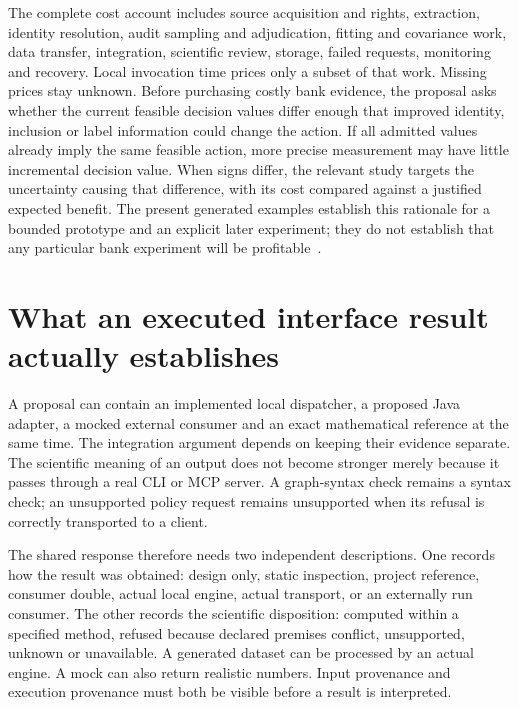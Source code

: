 The complete cost account includes source acquisition and rights, extraction,
identity resolution, audit sampling and adjudication, fitting and covariance
work, data transfer, integration, scientific review, storage, failed requests,
monitoring and recovery. Local invocation time prices only a subset of that
work. Missing prices stay unknown. Before purchasing costly bank evidence,
the proposal asks whether the current feasible decision values differ enough
that improved identity, inclusion or label information could change the action.
If all admitted values already imply the same feasible action, more precise
measurement may have little incremental decision value. When signs differ,
the relevant study targets the uncertainty causing that difference, with
its cost compared against a justified expected benefit. The present generated
examples establish this rationale for a bounded prototype and an explicit
later experiment; they do not establish that any particular bank experiment
will be profitable~\citep{exec13_observation_design,exec13_observation_exact}.
\label{exec13:observation-journey-end}


\section{What an executed interface result actually establishes}
\label{exec14:execution-meaning}

A proposal can contain an implemented local dispatcher, a proposed Java adapter,
a mocked external consumer and an exact mathematical reference at the same time.
The integration argument depends on keeping their evidence separate. The
scientific meaning of an output does not become stronger merely because it
passes through a real CLI or MCP server. A graph-syntax check remains a syntax
check; an unsupported policy request remains unsupported when its refusal is
correctly transported to a client.

The shared response therefore needs two independent descriptions. One records
how the result was obtained: design only, static inspection, project reference,
consumer double, actual local engine, actual transport, or an externally run
consumer. The other records the scientific disposition: computed within a
specified method, refused because declared premises conflict, unsupported,
unknown or unavailable. A generated dataset can be processed by an actual
engine. A mock can also return realistic numbers. Input provenance and execution
provenance must both be visible before a result is interpreted.

